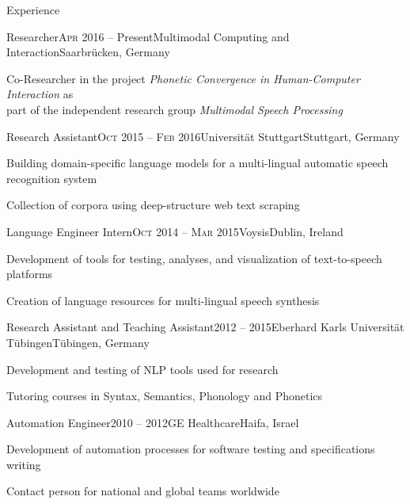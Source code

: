 \documentclass{resume} %
\begin{document}
\begin{rSection}{Experience}

\begin{rSubsection}{Researcher}{\textsc{Apr} 2016 -- Present}{Multimodal Computing and Interaction}{Saarbrücken, Germany}
	\setlength{\itemindent}{.7cm}
	
	\item Co-Researcher in the project \textit{Phonetic Convergence in Human-Computer Interaction} as\\\hspace*{.7cm}part of the independent research group \textit{Multimodal Speech Processing}
	
\end{rSubsection}

\begin{rSubsection}{Research Assistant}{\textsc{Oct} 2015 -- \textsc{Feb} 2016}{Universität Stuttgart}{Stuttgart, Germany}
	\setlength{\itemindent}{.7cm}
	
	\item Building domain-specific language models for a multi-lingual automatic speech recognition system
	
	\item Collection of corpora using deep-structure web text scraping
\end{rSubsection}

\begin{rSubsection}{Language Engineer Intern}{\textsc{Oct} 2014 -- \textsc{Mar} 2015}{Voysis}{Dublin, Ireland}
	\setlength{\itemindent}{.7cm}

	\item Development of tools for testing, analyses, and visualization of text-to-speech platforms
	
	\item Creation of language resources for multi-lingual speech synthesis
\end{rSubsection}

\begin{rSubsection}{Research Assistant and Teaching Assistant}{2012 -- 2015}{Eberhard Karls Universität Tübingen}{Tübingen, Germany}
	\setlength{\itemindent}{.7cm}
	
	\item Development and testing of NLP tools used for research %
	
	\item Tutoring courses in Syntax, Semantics, Phonology and Phonetics %
\end{rSubsection}

\begin{rSubsection}{Automation Engineer}{2010 -- 2012}{GE Healthcare}{Haifa, Israel}
	\setlength{\itemindent}{.7cm}
	
	\item Development of automation processes for software testing and specifications writing
	
	\item Contact person for national and global teams worldwide 
\end{rSubsection}


\end{rSection}
\end{document}

